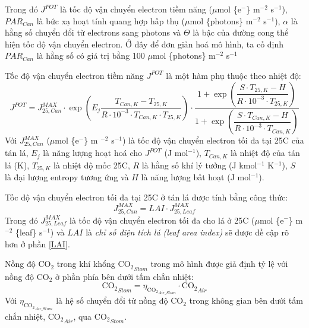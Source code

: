 \documentclass[a4paper]{article}
\begin{document}
Trong đó $J^{POT}$ là tốc độ vận chuyển electron tiềm năng ($\mu$mol \{e$^-$\} m$^{-2}$ s$^{-1}$), $PAR_{Can}$ là bức xạ hoạt tính quang hợp hấp thụ  ($\mu$mol \{photons\} m$^{-2}$ s$^{-1}$), $\alpha$ là hằng số chuyển đổi từ electrons sang photons và $\Theta$ là bậc của đường cong thể hiện tốc độ vận chuyển electron. Ở đây để đơn giản hoá mô hình, ta cố định $PAR_{Can}$ là hằng số có giá trị bằng 100 $\mu$mol \{photons\} m$^{-2}$ s$^{-1}$
\par
Tốc độ vận chuyển electron tiềm năng $J^{POT}$ là một hàm phụ thuộc theo nhiệt độ: 
\begin{equation}\label{eq:JPOT}
    J^{POT} = J^{MAX}_{25,Can} \cdot \exp\left(E_j \dfrac{T_{Can,K} - T_{25,K}}{R \cdot 10^{-3}\cdot T_{Can,K}\cdot T_{25,K}}\right)\cdot \dfrac{ 1 + \exp\left( \dfrac{S\cdot T_{25,K} - H}{R \cdot  10^{-3}\cdot T_{25,K}}\right) }{  1 + \exp\left( \dfrac{S\cdot T_{Can,K} - H}{R \cdot 10^{-3}\cdot T_{Can,K}}\right)}
\end{equation}
Với $J^{MAX}_{25,Can}$ ($\mu$mol \{e$^-$\} m $^{-2}$ s$^{-1}$) là tốc độ vận chuyển electron tối đa tại 25\degree C của tán lá, $E_j$ là năng lượng hoạt hoá cho $J^{POT}$ (J mol$^{-1}$), $T_{Can,K}$ là nhiệt độ của tán lá (K), $T_{25,K}$ là nhiệt độ mốc 25\degree C, $R$ là hằng số khí lý tưởng (J kmol$^{-1}$ K$^{-1}$), $S$ là đại lượng entropy tương ứng và $H$ là năng lượng bất hoạt (J mol$^{-1}$). 
\par
Tốc độ vận chuyển electron tối đa tại 25\degree C ở tán lá được tính bằng công thức:
\begin{equation}\label{eq:JMAX}
    J^{MAX}_{25,Can} = LAI\cdot J^{MAX}_{25,Leaf}
\end{equation}
Trong đó $J^{MAX}_{25,Leaf}$ là tốc độ vận chuyển electron tối đa cho lá ở 25\degree C ($\mu$mol \{e$^-$\} m$^{-2}$ \{leaf\} s$^{-1}$) và $LAI$ là \emph{chỉ số diện tích lá (leaf area index)} sẽ được đề cập rõ hơn ở phần \ref{LAI}.
\par
Nồng độ $\mathrm{CO_2}$ trong khí khổng $\mathrm{CO_2}_{Stom}$ trong mô hình được giả định tỷ lệ với nồng độ $\mathrm{CO_2}$ ở phần phía bên dưới tấm chắn nhiệt:
\begin{equation}\label{CO2stom}
    \mathrm{CO_2}_{Stom} = \eta_{\mathrm{CO_2}_{Air\_Stom}} \cdot \mathrm{CO_2}_{Air}
\end{equation}
Với $\eta_{\mathrm{CO_2}_{Air\_Stom}}$ là hệ số chuyển đổi từ nồng độ $\mathrm{CO_2}$ trong không gian bên dưới tấm chắn nhiệt, $\mathrm{CO_2}_{Air}$, qua $\mathrm{CO_2}_{Stom}$.
\par
\end{document}
